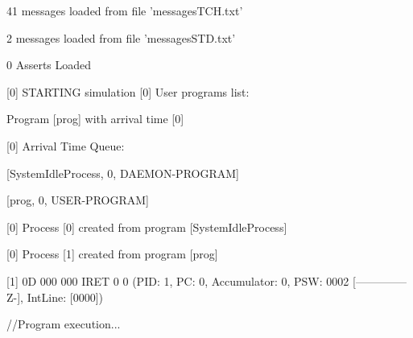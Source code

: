 41 messages loaded from file 'messagesTCH.txt'

2 messages loaded from file 'messagesSTD.txt'

0 Asserts Loaded

[\textcolor{termred}{0}] 
\textcolor{termred}{STARTING simulation
}
[\textcolor{termred}{0}] 
User programs list:

	Program [\textcolor{termcyan}{prog}] with arrival time [\textcolor{termcyan}{0}]
	
[\textcolor{termred}{0}] 
Arrival Time Queue:

		[\textcolor{termgreen}{SystemIdleProcess}, \textcolor{termred}{0}, \textcolor{termgreen}{DAEMON-PROGRAM}]

		[\textcolor{termgreen}{prog}, \textcolor{termred}{0}, \textcolor{termgreen}{USER-PROGRAM}]

	
[\textcolor{termred}{0}] 
\textcolor{termgreen}{Process [0] created from program [SystemIdleProcess]}

	
[\textcolor{termred}{0}] 
\textcolor{termgreen}{Process [1] created from program [prog]}

[\textcolor{termred}{1}] 
{0D 000 000}
 IRET 0 0 (PID: \textcolor{termgreen}{1}, PC: \textcolor{termred}{0}, Accumulator: \textcolor{termred}{0}, PSW: \textcolor{termred}{0002} [\textcolor{termred}{--------------Z-}], IntLine: [\textcolor{termred}{0000}])

//Program execution...